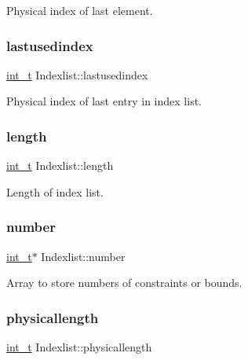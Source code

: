 Physical index of last element. \mbox{\label{class_indexlist_af35ad1bcce6117b36f7247c248e322c4}} 
\subsubsection{\texorpdfstring{lastusedindex}{lastusedindex}}
{\footnotesize\ttfamily \hyperlink{_types_8hpp_ab6fd6105e64ed14a0c9281326f05e623}{int\+\_\+t} Indexlist\+::lastusedindex\hspace{0.3cm}{\ttfamily [protected]}}

Physical index of last entry in index list. \mbox{\label{class_indexlist_a615eead1528a5af66d40e5392f39b4b3}} 
\subsubsection{\texorpdfstring{length}{length}}
{\footnotesize\ttfamily \hyperlink{_types_8hpp_ab6fd6105e64ed14a0c9281326f05e623}{int\+\_\+t} Indexlist\+::length\hspace{0.3cm}{\ttfamily [protected]}}

Length of index list. \mbox{\label{class_indexlist_aebc85737bcca22d4e38a40b89f3d517a}} 
\subsubsection{\texorpdfstring{number}{number}}
{\footnotesize\ttfamily \hyperlink{_types_8hpp_ab6fd6105e64ed14a0c9281326f05e623}{int\+\_\+t}$\ast$ Indexlist\+::number\hspace{0.3cm}{\ttfamily [protected]}}

Array to store numbers of constraints or bounds. \mbox{\label{class_indexlist_ad648cebc248309f0be3c6f3647cd944c}} 
\subsubsection{\texorpdfstring{physicallength}{physicallength}}
{\footnotesize\ttfamily \hyperlink{_types_8hpp_ab6fd6105e64ed14a0c9281326f05e623}{int\+\_\+t} Indexlist\+::physicallength\hspace{0.3cm}{\ttfamily [protected]}}


